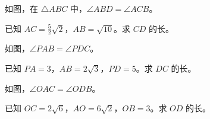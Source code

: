 \documentclass{exam-zh}
\begin{document}

\begin{problem}[points=10]
  \noindent
  \begin{minipage}[t]{\dimexpr\linewidth-60mm-6mm\relax}
    \vspace{0pt}
    如图，在 $\triangle ABC$ 中，$\angle ABD=\angle ACB$。

已知 $AC=\frac{5}{2}\sqrt{2}$，$AB=\sqrt{10}$。求 $CD$ 的长。
    
  \end{minipage}\hfill
  \begin{diagramcoltikz}{60mm}{}
  }
  \end{diagramcoltikz}
  \par\medskip
  \answerarea[54mm]
\end{problem}



\begin{problem}[points=10]
  \noindent
  \begin{minipage}[t]{\dimexpr\linewidth-60mm-6mm\relax}
    \vspace{0pt}
    如图，$\angle PAB=\angle PDC$。

已知 $PA=3$，$AB=2\sqrt{3}$，$PD=5$。求 $DC$ 的长。
    
  \end{minipage}\hfill
  \begin{diagramcoltikz}{60mm}{}
  }
  \end{diagramcoltikz}
  \par\medskip
  \answerarea[54mm]
\end{problem}



\begin{problem}[points=10]
  \noindent
  \begin{minipage}[t]{\dimexpr\linewidth-60mm-6mm\relax}
    \vspace{0pt}
    如图，$\angle OAC=\angle ODB$。

已知 $OC=2\sqrt{6}$，$AO=6\sqrt{2}$，$OB=3$。求 $OD$ 的长。
    
  \end{minipage}\hfill
  \begin{diagramcoltikz}{60mm}{}
  }
  \end{diagramcoltikz}
  \par\medskip
  \answerarea[54mm]
\end{problem}
\end{document}
